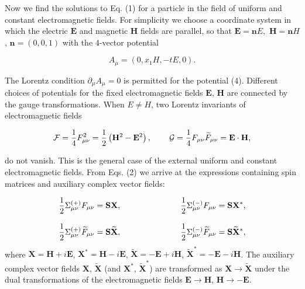 \documentclass[a4paper,12pt]{article}
\begin{document}
Now we find the solutions to Eq. (1) for a particle in the field
of uniform and constant electromagnetic fields. For simplicity we
choose a coordinate system in which the electric $\mathbf{E}$ and
magnetic $\mathbf{H}$ fields are parallel, so that
$\mathbf{E}=\mathbf{n}E,$ $\mathbf{H}=\mathbf{n}H$, $
\mathbf{n}=(0,0,1)$ with the 4-vector potential

\begin{equation}
A_\mu =\left( 0,x_1H,-tE,0\right).  \label{4}
\end{equation}

The Lorentz condition $\partial_\mu A_\mu =0$ is permitted for the
potential (4). Different choices of potentials for the fixed
electromagnetic fields $ \mathbf{E}$, $\mathbf{H}$ are connected
by the gauge transformations. When $ E\neq H$, two Lorentz
invariants of electromagnetic fields

\begin{equation}
\mathcal{F}=\frac 14F_{\mu \nu }^2=\frac 12\left( \mathbf{H}^2-\mathbf{E}
^2\right) ,\hspace{0.3in}\mathcal{G}=\frac 14F_{\mu \nu }\widetilde{F}_{\mu
\nu }=\mathbf{E}\cdot \mathbf{H},  \label{5}
\end{equation}

do not vanish. This is the general case of the external uniform and constant
electromagnetic fields. From Eqs. (2) we arrive at the expressions
containing spin matrices and auxiliary complex vector fields:

\[
\frac 12\Sigma _{\mu \nu }^{(+)}F_{\mu \nu }=\mathbf{SX},\hspace{1.0in}\frac
12\Sigma _{\mu \nu }^{(-)}F_{\mu \nu }=\mathbf{SX}^{*},
\]
\vspace{-8mm}
\begin{equation}
\label{6}
\end{equation}
\vspace{-8mm}
\[
\frac 12\Sigma _{\mu \nu }^{(+)}\widetilde{F}_{\mu \nu
}=\mathbf{S} \widetilde{\mathbf{X}},\hspace{1.0in}\frac 12\Sigma
_{\mu \nu }^{(-)} \widetilde{F}_{\mu \nu
}=\mathbf{S}\widetilde{\mathbf{X}}^{*},
\]
where $\mathbf{X}=\mathbf{H}+i\mathbf{E}$, $\mathbf{X}^{*}=\mathbf{H}-i
\mathbf{E}$, $\widetilde{\mathbf{X}}=-\mathbf{E}+i\mathbf{H}$, $\widetilde{
\mathbf{X}}^{*}=-\mathbf{E}-i\mathbf{H}$. The auxiliary complex vector
fields $\mathbf{X}$, $\widetilde{\mathbf{X}}$ (and $\mathbf{X}^{*}$,
$\widetilde{\mathbf{X}}^{*}$) are transformed as $\mathbf{X}\rightarrow
\widetilde{\mathbf{X}}$ under the dual transformations of the
electromagnetic fields $\mathbf{E}\rightarrow \mathbf{H}$, $\mathbf{H}
\rightarrow -\mathbf{E}$.
\end{document}
